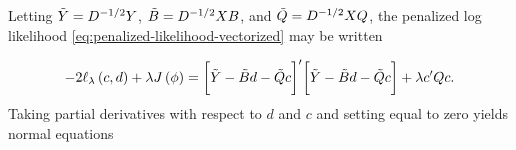 %
%
%
%
%
%


Letting $\tilde{Y} = D^{-1/2} Y$, $\tilde{B} = D^{-1/2} X B $, and $\tilde{Q} = D^{-1/2} X Q$, the penalized log likelihood \ref{eq:penalized-likelihood-vectorized} may be written

\begin{equation}\label{eq:penalized-loglik-tilde-vectorized}
-2\ell_\lambda \left(c, d \right) + \lambda J\left( \phi \right) = \bigg[ \tilde{Y} - \tilde{B} d - \tilde{Q} c\bigg]'\bigg[ \tilde{Y} - \tilde{B} d - \tilde{Q} c\bigg] + \lambda c'Qc.
\end{equation}
\noindent
Taking partial derivatives with respect to $d$ and $c$ and setting equal to zero yields normal equations 


